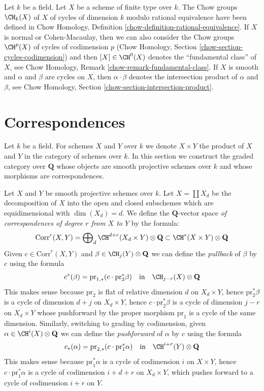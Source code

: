 \medskip\noindent
Let $k$ be a field. Let $X$ be a scheme of finite type over $k$.
The Chow groups $\CH_k(X)$ of $X$ of cycles of dimension $k$
modulo rational equivalence have been defined in
Chow Homology, Definition \ref{chow-definition-rational-equivalence}.
If $X$ is normal or Cohen-Macaulay, then we can also consider
the Chow groups $\CH^p(X)$ of cycles of codimension $p$
(Chow Homology, Section \ref{chow-section-cycles-codimension})
and then $[X] \in \CH^0(X)$ denotes the ``fundamental class'' of $X$, see
Chow Homology, Remark \ref{chow-remark-fundamental-class}.
If $X$ is smooth and $\alpha$ and $\beta$ are cycles on $X$,
then $\alpha \cdot \beta$ denotes the intersection product of
$\alpha$ and $\beta$, see
Chow Homology, Section \ref{chow-section-intersection-product}.

\section{Correspondences}
\label{weil-section-correspondences}
Let $k$ be a field. For schemes $X$ and $Y$ over $k$ we denote
$X \times Y$ the product of $X$ and $Y$ in the category of schemes
over $k$. In this section we construct the graded category over
$\mathbf{Q}$ whose objects are smooth projective schemes over $k$ and whose
morphisms are correspondences.

\medskip\noindent
Let $X$ and $Y$ be smooth projective schemes over $k$.
Let $X = \coprod X_d$ be the decomposition of $X$ into
the open and closed subschemes which are equidimensional
with $\dim(X_d) = d$. We define the $\mathbf{Q}$-vector space
{\it of correspondences of degree $r$ from $X$ to $Y$}
by the formula:
$$
\text{Corr}^r(X, Y) =
\bigoplus\nolimits_d \CH^{d + r}(X_d \times Y) \otimes \mathbf{Q}
\subset
\CH^*(X \times Y) \otimes \mathbf{Q}
$$
Given $c \in \text{Corr}^r(X, Y)$ and $\beta \in \CH_j(Y) \otimes \mathbf{Q}$
we can define the {\it pullback} of $\beta$ by $c$ using the formula
$$
c^*(\beta) = \text{pr}_{1, *}(c \cdot \text{pr}_2^*\beta)
\quad\text{in}\quad
\CH_{j - r}(X) \otimes \mathbf{Q}
$$
This makes sense because $\text{pr}_2$ is flat of relative dimension
$d$ on $X_d \times Y$, hence $\text{pr}_2^*\beta$ is a cycle of
dimension $d + j$ on $X_d \times Y$, hence $c \cdot \text{pr}_2^*\beta$
is a cycle of dimension $j - r$ on $X_d \times Y$ whose pushforward
by the proper morphism $\text{pr}_1$ is a cycle of the same dimension.
Similarly, switching to grading by codimension,
given $\alpha \in \CH^i(X) \otimes \mathbf{Q}$ we can define the
{\it pushforward} of $\alpha$ by $c$ using the formula
$$
c_*(\alpha) = \text{pr}_{2, *}(c \cdot \text{pr}_1^*\alpha)
\quad\text{in}\quad
\CH^{i + r}(Y) \otimes \mathbf{Q}
$$
This makes sense because $\text{pr}_1^*\alpha$ is a cycle of codimension
$i$ on $X \times Y$, hence $c \cdot \text{pr}_1^*\alpha$ is a cycle
of codimension $i + d + r$ on $X_d \times Y$, which pushes forward
to a cycle of codimension $i + r$ on $Y$.

